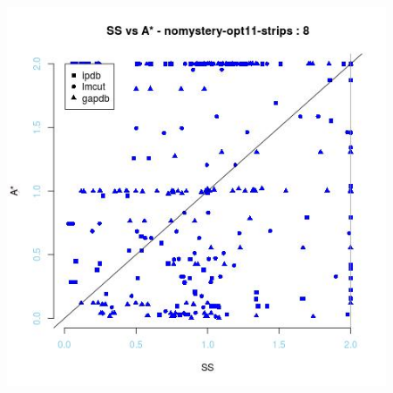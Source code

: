 \begin{figure}[!htb]
\endminipage\hfill
{}%
  \includegraphics[width=\linewidth]{images/nomystery-opt11-strips}
\endminipage


\end{figure}
